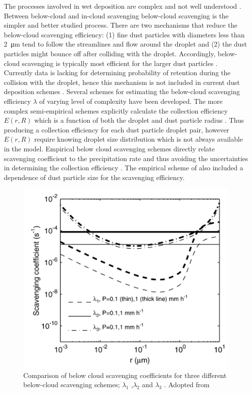 The processes involved in wet deposition are complex and not well understood . Between below-cloud and in-cloud scavenging below-cloud scavenging is the simpler and better studied process.
There are two mechanisms that reduce the below-cloud scavenging efficiency: (1) fine dust particles with diameters less than \SI{2}{\micro\metre} tend to follow the streamlines and flow around the droplet and (2) the dust particles might bounce off after colliding with the droplet. 
Accordingly, below-cloud scavenging is typically most efficient for the larger dust particles .
Currently data is lacking for determining  probability of retention during the collision with the droplet, hence this mechanism is not included in current dust deposition schemes \parencite{ShaoYaping2008PaMo}. Several schemes for estimating the below-cloud scavenging efficiency $\lambda$ of varying level of complexity have been developed. The more complex semi-empirical schemes explicitly calculate the collection efficiency $E(r,R)$ which is a function of both the droplet and dust particle radius \parencite{seinfeld1998atmospheric, ShaoYaping2008PaMo}. 
Thus producing a collection efficiency for each dust particle droplet pair, however $E(r,R)$ require knowing droplet size distribution which is not always available in the model. Empirical below cloud scavenging schemes directly relate scavenging coefficient to the precipitation rate \parencite{brandt2002modelling} and thus avoiding the uncertainties in determining  the collection efficiency \parencite{jung2006intercomparison}. The empirical scheme of \parencite{laakso2003ultrafine} also included a dependence of dust particle size for the scavenging efficiency. 
\begin{figure}[htpb]
    \centering
    \includegraphics[draft=False,scale=.5]{texfiles/figs/Scavenging.PNG}
    \caption{Comparison of below cloud scavenging coefficients for three different below-cloud scavenging schemes; $\lambda_1$ \textcite{jung2006intercomparison},$\lambda_2$ \textcite{brandt2002modelling} and $\lambda_3$ \textcite{laakso2003ultrafine}. Adopted from \textcite{jung2006intercomparison}}
    \label{fig:scavenging}
\end{figure}
